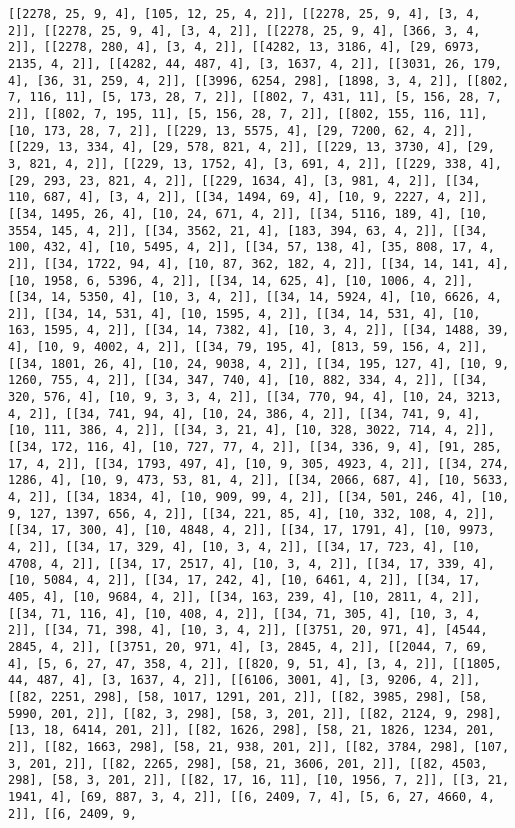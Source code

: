 \documentclass[12pt,fleqn]{article}\usepackage{../../common}
\begin{document}
\begin{verbatim}
[[2278, 25, 9, 4], [105, 12, 25, 4, 2]], [[2278, 25, 9, 4], [3, 4, 2]], [[2278, 25, 9, 4], [3, 4, 2]], [[2278, 25, 9, 4], [366, 3, 4, 2]], [[2278, 280, 4], [3, 4, 2]], [[4282, 13, 3186, 4], [29, 6973, 2135, 4, 2]], [[4282, 44, 487, 4], [3, 1637, 4, 2]], [[3031, 26, 179, 4], [36, 31, 259, 4, 2]], [[3996, 6254, 298], [1898, 3, 4, 2]], [[802, 7, 116, 11], [5, 173, 28, 7, 2]], [[802, 7, 431, 11], [5, 156, 28, 7, 2]], [[802, 7, 195, 11], [5, 156, 28, 7, 2]], [[802, 155, 116, 11], [10, 173, 28, 7, 2]], [[229, 13, 5575, 4], [29, 7200, 62, 4, 2]], [[229, 13, 334, 4], [29, 578, 821, 4, 2]], [[229, 13, 3730, 4], [29, 3, 821, 4, 2]], [[229, 13, 1752, 4], [3, 691, 4, 2]], [[229, 338, 4], [29, 293, 23, 821, 4, 2]], [[229, 1634, 4], [3, 981, 4, 2]], [[34, 110, 687, 4], [3, 4, 2]], [[34, 1494, 69, 4], [10, 9, 2227, 4, 2]], [[34, 1495, 26, 4], [10, 24, 671, 4, 2]], [[34, 5116, 189, 4], [10, 3554, 145, 4, 2]], [[34, 3562, 21, 4], [183, 394, 63, 4, 2]], [[34, 100, 432, 4], [10, 5495, 4, 2]], [[34, 57, 138, 4], [35, 808, 17, 4, 2]], [[34, 1722, 94, 4], [10, 87, 362, 182, 4, 2]], [[34, 14, 141, 4], [10, 1958, 6, 5396, 4, 2]], [[34, 14, 625, 4], [10, 1006, 4, 2]], [[34, 14, 5350, 4], [10, 3, 4, 2]], [[34, 14, 5924, 4], [10, 6626, 4, 2]], [[34, 14, 531, 4], [10, 1595, 4, 2]], [[34, 14, 531, 4], [10, 163, 1595, 4, 2]], [[34, 14, 7382, 4], [10, 3, 4, 2]], [[34, 1488, 39, 4], [10, 9, 4002, 4, 2]], [[34, 79, 195, 4], [813, 59, 156, 4, 2]], [[34, 1801, 26, 4], [10, 24, 9038, 4, 2]], [[34, 195, 127, 4], [10, 9, 1260, 755, 4, 2]], [[34, 347, 740, 4], [10, 882, 334, 4, 2]], [[34, 320, 576, 4], [10, 9, 3, 3, 4, 2]], [[34, 770, 94, 4], [10, 24, 3213, 4, 2]], [[34, 741, 94, 4], [10, 24, 386, 4, 2]], [[34, 741, 9, 4], [10, 111, 386, 4, 2]], [[34, 3, 21, 4], [10, 328, 3022, 714, 4, 2]], [[34, 172, 116, 4], [10, 727, 77, 4, 2]], [[34, 336, 9, 4], [91, 285, 17, 4, 2]], [[34, 1793, 497, 4], [10, 9, 305, 4923, 4, 2]], [[34, 274, 1286, 4], [10, 9, 473, 53, 81, 4, 2]], [[34, 2066, 687, 4], [10, 5633, 4, 2]], [[34, 1834, 4], [10, 909, 99, 4, 2]], [[34, 501, 246, 4], [10, 9, 127, 1397, 656, 4, 2]], [[34, 221, 85, 4], [10, 332, 108, 4, 2]], [[34, 17, 300, 4], [10, 4848, 4, 2]], [[34, 17, 1791, 4], [10, 9973, 4, 2]], [[34, 17, 329, 4], [10, 3, 4, 2]], [[34, 17, 723, 4], [10, 4708, 4, 2]], [[34, 17, 2517, 4], [10, 3, 4, 2]], [[34, 17, 339, 4], [10, 5084, 4, 2]], [[34, 17, 242, 4], [10, 6461, 4, 2]], [[34, 17, 405, 4], [10, 9684, 4, 2]], [[34, 163, 239, 4], [10, 2811, 4, 2]], [[34, 71, 116, 4], [10, 408, 4, 2]], [[34, 71, 305, 4], [10, 3, 4, 2]], [[34, 71, 398, 4], [10, 3, 4, 2]], [[3751, 20, 971, 4], [4544, 2845, 4, 2]], [[3751, 20, 971, 4], [3, 2845, 4, 2]], [[2044, 7, 69, 4], [5, 6, 27, 47, 358, 4, 2]], [[820, 9, 51, 4], [3, 4, 2]], [[1805, 44, 487, 4], [3, 1637, 4, 2]], [[6106, 3001, 4], [3, 9206, 4, 2]], [[82, 2251, 298], [58, 1017, 1291, 201, 2]], [[82, 3985, 298], [58, 5990, 201, 2]], [[82, 3, 298], [58, 3, 201, 2]], [[82, 2124, 9, 298], [13, 18, 6414, 201, 2]], [[82, 1626, 298], [58, 21, 1826, 1234, 201, 2]], [[82, 1663, 298], [58, 21, 938, 201, 2]], [[82, 3784, 298], [107, 3, 201, 2]], [[82, 2265, 298], [58, 21, 3606, 201, 2]], [[82, 4503, 298], [58, 3, 201, 2]], [[82, 17, 16, 11], [10, 1956, 7, 2]], [[3, 21, 1941, 4], [69, 887, 3, 4, 2]], [[6, 2409, 7, 4], [5, 6, 27, 4660, 4, 2]], [[6, 2409, 9, 
\end{verbatim}
\end{document}
